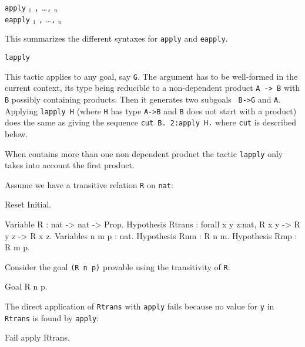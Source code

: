 \begin{coq_example*}
\begin{Variants}
\item {} {\tt apply} {\term$_1$}  {\tt ,} \ldots {\tt ,} {\term$_n$} \\
   {\tt eapply} {\term$_1$}  {\tt ,} \ldots {\tt ,} {\term$_n$} 

  This summarizes the different syntaxes for {\tt apply} and {\tt eapply}.

\item {\tt lapply {\term}} 

  This tactic applies to any goal, say {\tt G}.  The argument {\term}
  has to be well-formed in the current context, its type being
  reducible to a non-dependent product {\tt A -> B} with {\tt B}
  possibly containing products. Then it generates two subgoals {\tt
  B->G} and {\tt A}. Applying {\tt lapply H} (where {\tt H} has type
  {\tt A->B} and {\tt B} does not start with a product) does the same
  as giving the sequence {\tt cut B. 2:apply H.} where {\tt cut} is
  described below.

  \Warning When {\term} contains more than one non
  dependent product the tactic {\tt lapply} only takes into account the
  first product.

\end{Variants}

\Example
Assume we have a transitive relation {\tt R} on {\tt nat}:
\label{eapply-example}

\begin{coq_eval}
Reset Initial.
\end{coq_eval}
\begin{coq_example*}
Variable R : nat -> nat -> Prop.
Hypothesis Rtrans : forall x y z:nat, R x y -> R y z -> R x z.
Variables n m p : nat.
Hypothesis Rnm : R n m.
Hypothesis Rmp : R m p.
\end{coq_example*}

Consider the goal {\tt (R n p)} provable using the transitivity of
{\tt R}:

\begin{coq_example*}
Goal R n p.
\end{coq_example*}

The direct application of {\tt Rtrans} with {\tt apply} fails because
no value for {\tt y} in {\tt Rtrans} is found by {\tt apply}:

\begin{coq_example}
Fail apply Rtrans.
\end{coq_example}


\end{coq_example*}
